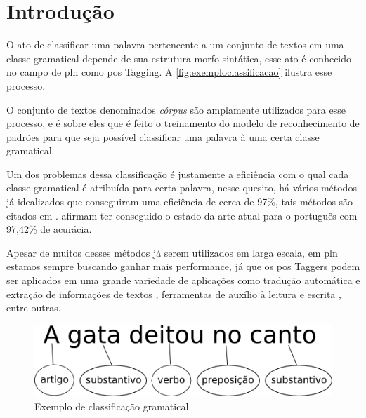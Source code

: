 \chapter{Introdução}\label{introducao}

O ato de classificar uma palavra pertencente a um conjunto de textos em uma classe gramatical depende de sua estrutura morfo-sintática, esse ato é conhecido no campo de \ac{pln} como \ac{pos} Tagging. A \autoref{fig:exemploclassificacao} ilustra esse processo. 

O conjunto de textos denominados \textit{córpus} são amplamente utilizados para esse processo, e é sobre eles que é feito o treinamento do modelo de reconhecimento de padrões para que seja possível classificar uma palavra à uma certa classe gramatical.

Um dos problemas dessa classificação é justamente a eficiência com o qual cada classe gramatical é atribuída para certa palavra, nesse quesito, há vários métodos já idealizados que conseguiram uma eficiência de cerca de 97\%, tais métodos são citados em \cite{dos2014training, collobert2011deep, fonseca2015evaluating}.  afirmam ter conseguido o estado-da-arte atual para o português com 97,42\% de acurácia.

Apesar de muitos desses métodos já serem utilizados em larga escala, em \ac{pln} estamos sempre buscando ganhar mais performance, já que os \ac{pos} Taggers podem ser aplicados em uma grande variedade de aplicações como tradução automática e extração de informações de textos \cite{manning1999foundations}, ferramentas de auxílio à leitura e escrita \cite{marquiafavel2010processo}, entre outras.

\begin{figure}[htb]
  \caption{Exemplo de classificação gramatical}\label{fig:exemploclassificacao}
  \begin{center}
      \includegraphics[scale=0.5]{img/exemplo_classificacao}
  \end{center}
\end{figure}

